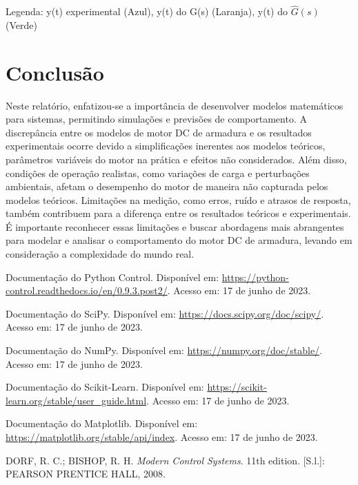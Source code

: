 \documentclass[10pt]{article}
\begin{document}
\quad Legenda: y(t) experimental (Azul), y(t) do G(s) (Laranja), y(t) do $\hat{G}(s)$ (Verde)

\section{Conclusão}

\quad Neste relatório, enfatizou-se a importância de desenvolver modelos matemáticos para sistemas,
permitindo simulações e previsões de comportamento.
A discrepância entre os modelos de motor DC de armadura e os resultados experimentais ocorre devido a simplificações inerentes aos modelos teóricos,
parâmetros variáveis do motor na prática e efeitos não considerados.
Além disso, condições de operação realistas, como variações de carga e perturbações ambientais,
afetam o desempenho do motor de maneira não capturada pelos modelos teóricos.
Limitações na medição, como erros, ruído e atrasos de resposta,
também contribuem para a diferença entre os resultados teóricos e experimentais.
É importante reconhecer essas limitações e buscar abordagens mais abrangentes para modelar e analisar o comportamento do motor DC de armadura,
levando em consideração a complexidade do mundo real.

\begin{thebibliography}{99}
     Documentação do Python Control. Disponível em: \url{https://python-control.readthedocs.io/en/0.9.3.post2/}. Acesso em: 17 de junho de 2023.
    
     Documentação do SciPy. Disponível em: \url{https://docs.scipy.org/doc/scipy/}. Acesso em: 17 de junho de 2023.

     Documentação do NumPy. Disponível em: \url{https://numpy.org/doc/stable/}. Acesso em: 17 de junho de 2023.

     Documentação do Scikit-Learn. Disponível em: \url{https://scikit-learn.org/stable/user_guide.html}. Acesso em: 17 de junho de 2023.
    
     Documentação do Matplotlib. Disponível em: \url{https://matplotlib.org/stable/api/index}. Acesso em: 17 de junho de 2023.

     DORF, R. C.; BISHOP, R. H. \textit{Modern Control Systems}. 11th edition. [S.l.]: PEARSON PRENTICE HALL, 2008.
\end{thebibliography}
\end{document}
